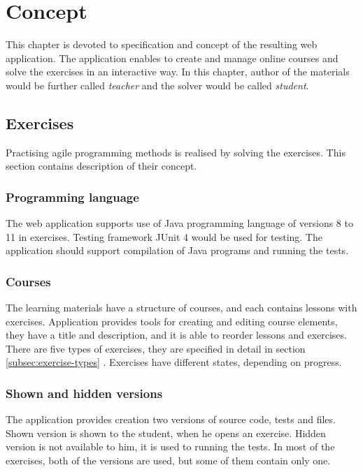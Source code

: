 \chapter[Concept]{Concept}
\label{ch:concept}
This chapter is devoted to specification and concept of the resulting web application. The application enables to create and manage online courses and solve the exercises in an interactive way. In this chapter, author of the materials would be further called \textit{teacher} and the solver would be called \textit{student}.

    \section{Exercises}
    \label{sec:exercises}
    Practising agile programming methods is realised by solving the exercises. This section contains description of their concept.
    
        \subsection{Programming language}
        The web application supports use of Java programming language of versions 8 to 11 in exercises. Testing framework JUnit 4 would be used for testing. The application should support compilation of Java programs and running the tests.
        
        \subsection{Courses}
        The learning materials have a structure of courses, and each contains lessons with exercises. Application provides tools for creating and editing course elements, they have a title and description, and it is able to reorder lessons and exercises. There are five types of exercises, they are specified in detail in section \ref{subsec:exercise-types} . Exercises have different states, depending on progress.
        
        \subsection{Shown and hidden versions}
        The application provides creation two versions of source code, tests and files. Shown version is shown to the student, when he opens an exercise. Hidden version is not available to him, it is used to running the tests. In most of the exercises, both of the versions are used, but some of them contain only one.
        
